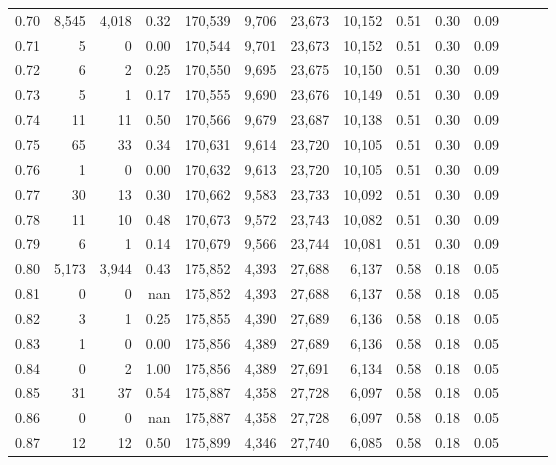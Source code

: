 \begin{tabular}{rrrrrrrrrrrrrr}
0.70 &   8,545 &  4,018 &  0.32 &  170,539 &    9,706 &  23,673 &  10,152 &  0.51 &  0.30 &      0.09 \\
0.71 &       5 &      0 &  0.00 &  170,544 &    9,701 &  23,673 &  10,152 &  0.51 &  0.30 &      0.09 \\
0.72 &       6 &      2 &  0.25 &  170,550 &    9,695 &  23,675 &  10,150 &  0.51 &  0.30 &      0.09 \\
0.73 &       5 &      1 &  0.17 &  170,555 &    9,690 &  23,676 &  10,149 &  0.51 &  0.30 &      0.09 \\
0.74 &      11 &     11 &  0.50 &  170,566 &    9,679 &  23,687 &  10,138 &  0.51 &  0.30 &      0.09 \\
0.75 &      65 &     33 &  0.34 &  170,631 &    9,614 &  23,720 &  10,105 &  0.51 &  0.30 &      0.09 \\
0.76 &       1 &      0 &  0.00 &  170,632 &    9,613 &  23,720 &  10,105 &  0.51 &  0.30 &      0.09 \\
0.77 &      30 &     13 &  0.30 &  170,662 &    9,583 &  23,733 &  10,092 &  0.51 &  0.30 &      0.09 \\
0.78 &      11 &     10 &  0.48 &  170,673 &    9,572 &  23,743 &  10,082 &  0.51 &  0.30 &      0.09 \\
0.79 &       6 &      1 &  0.14 &  170,679 &    9,566 &  23,744 &  10,081 &  0.51 &  0.30 &      0.09 \\
0.80 &   5,173 &  3,944 &  0.43 &  175,852 &    4,393 &  27,688 &   6,137 &  0.58 &  0.18 &      0.05 \\
0.81 &       0 &      0 &   nan &  175,852 &    4,393 &  27,688 &   6,137 &  0.58 &  0.18 &      0.05 \\
0.82 &       3 &      1 &  0.25 &  175,855 &    4,390 &  27,689 &   6,136 &  0.58 &  0.18 &      0.05 \\
0.83 &       1 &      0 &  0.00 &  175,856 &    4,389 &  27,689 &   6,136 &  0.58 &  0.18 &      0.05 \\
0.84 &       0 &      2 &  1.00 &  175,856 &    4,389 &  27,691 &   6,134 &  0.58 &  0.18 &      0.05 \\
0.85 &      31 &     37 &  0.54 &  175,887 &    4,358 &  27,728 &   6,097 &  0.58 &  0.18 &      0.05 \\
0.86 &       0 &      0 &   nan &  175,887 &    4,358 &  27,728 &   6,097 &  0.58 &  0.18 &      0.05 \\
0.87 &      12 &     12 &  0.50 &  175,899 &    4,346 &  27,740 &   6,085 &  0.58 &  0.18 &      0.05 \\

\end{tabular}
